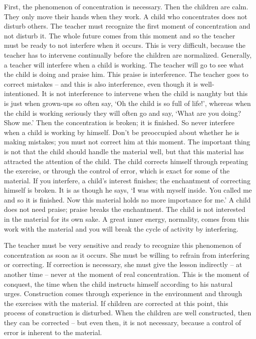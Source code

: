 \documentclass[lang=cn,10pt]{elegantbook}
\begin{document}
First, the phenomenon of concentration is necessary. Then the
children are calm. They only move their hands when they work. A
child who concentrates does not disturb others. The teacher must
recognize the first moment of concentration and not disturb it. The
whole future comes from this moment and so the teacher must be
ready to not interfere when it occurs. This is very difficult, because
the teacher has to intervene continually before the children are
normalized. Generally, a teacher will interfere when a child is
working. The teacher will go to see what the child is doing and praise
him. This praise is interference. The teacher goes to correct
mistakes – and this is also interference, even though it is well-
intentioned. It is not interference to intervene when the child is
naughty but this is just when grown-ups so often say, ‘Oh the child is
so full of life!’, whereas when the child is working seriously they will
often go and say, ‘What are you doing? Show me.’ Then the
concentration is broken; it is finished. So never interfere when a child
is working by himself. Don’t be preoccupied about whether he is
making mistakes; you must not correct him at this moment. The
important thing is not that the child should handle the material well,
but that this material has attracted the attention of the child. The
child corrects himself through repeating the exercise, or through the
control of error, which is exact for some of the material. If you
interfere, a child’s interest finishes; the enchantment of correcting
himself is broken. It is as though he says, ‘I was with myself inside.
You called me and so it is finished. Now this material holds no more
importance for me.’ A child does not need praise; praise breaks the
enchantment. The child is not interested in the material for its own
sake. A great inner energy, normality, comes from this work with the
material and you will break the cycle of activity by interfering.

The teacher must be very sensitive and ready to recognize this
phenomenon of concentration as soon as it occurs. She must be
willing to refrain from interfering or correcting. If correction is
necessary, she must give the lesson indirectly – at another time –
never at the moment of real concentration. This is the moment of
conquest, the time when the child instructs himself according to his
natural urges. Construction comes through experience in the
environment and through the exercises with the material. If children
are corrected at this point, this process of construction is disturbed.
When the children are well constructed, then they can be corrected –
but even then, it is not necessary, because a control of error is
inherent to the material.
\end{document}
